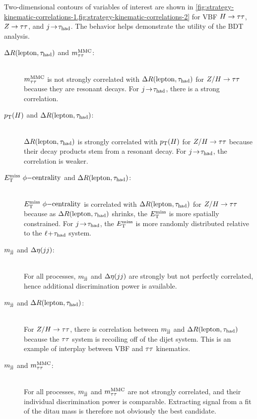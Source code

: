 Two-dimensional contours of variables of interest are shown in \cref{fig:strategy-kinematic-correlations-1,fig:strategy-kinematic-correlations-2} for VBF $\Htautau$, $\Ztautau$, and $\fakes$. The behavior helps demonstrate the utility of the BDT analysis.
% 
\begin{description}
    \item[$\dR$ and $\mMMC$:] \hfill \\
      $\mMMC$ is not strongly correlated with $\dR$ for $\ZHtautau$ because they are resonant decays. For $\fakes$, there is a strong correlation. 
    \item[$\pt(H)$ and $\dR$:] \hfill \\
      $\dR$ is strongly correlated with $\pt(H)$ for $\ZHtautau$ because their decay products stem from a resonant decay. For $\fakes$, the correlation is weaker.
    \item[$\metphicent$ and $\dR$:] \hfill \\
      $\metphicent$ is correlated with $\dR$ for $\ZHtautau$ because as $\dR$ shrinks, the $\MET$ is more spatially constrained. For $\fakes$, the $\MET$ is more randomly distributed relative to the $\LTT$ system.
    \item[$\mjj$ and $\deta$:] \hfill \\
      For all processes, $\mjj$ and $\deta$ are strongly but not perfectly correlated, hence additional discrimination power is available.
    \item[$\mjj$ and $\dR$:] \hfill \\
      For $\ZHtautau$, there is correlation between $\mjj$ and $\dR$ because the $\tautau$ system is recoiling off of the dijet system. This is an example of interplay between VBF and $\tautau$ kinematics.
    \item[$\mjj$ and $\mMMC$:] \hfill \\
      For all processes, $\mjj$ and $\mMMC$ are not strongly correlated, and their individual discrimination power is comparable. Extracting signal from a fit of the ditau mass is therefore not obviously the best candidate.
\end{description}
%


